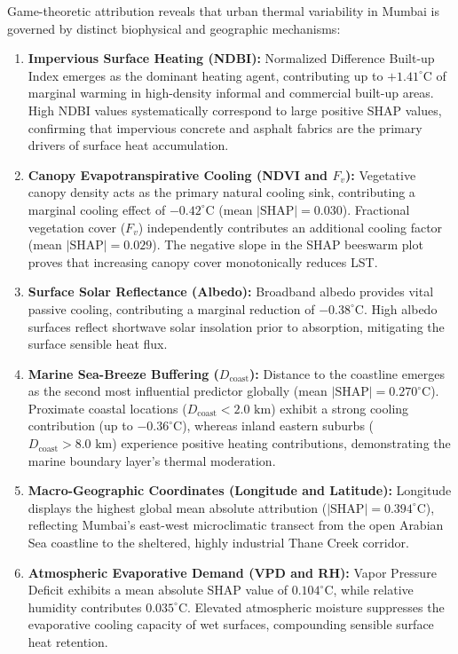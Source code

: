 \documentclass[a4paper,fleqn]{cas-sc}
\begin{document}
Game-theoretic attribution reveals that urban thermal variability in Mumbai is governed by distinct biophysical and geographic mechanisms:
\begin{enumerate}[1.]
    \item \textbf{Impervious Surface Heating (NDBI):} Normalized Difference Built-up Index emerges as the dominant heating agent, contributing up to $+1.41^\circ\text{C}$ of marginal warming in high-density informal and commercial built-up areas. High NDBI values systematically correspond to large positive SHAP values, confirming that impervious concrete and asphalt fabrics are the primary drivers of surface heat accumulation.
    \item \textbf{Canopy Evapotranspirative Cooling (NDVI and $F_v$):} Vegetative canopy density acts as the primary natural cooling sink, contributing a marginal cooling effect of $-0.42^\circ\text{C}$ (mean $|\text{SHAP}| = 0.030$). Fractional vegetation cover ($F_v$) independently contributes an additional cooling factor (mean $|\text{SHAP}| = 0.029$). The negative slope in the SHAP beeswarm plot proves that increasing canopy cover monotonically reduces LST.
    \item \textbf{Surface Solar Reflectance (Albedo):} Broadband albedo provides vital passive cooling, contributing a marginal reduction of $-0.38^\circ\text{C}$. High albedo surfaces reflect shortwave solar insolation prior to absorption, mitigating the surface sensible heat flux.
    \item \textbf{Marine Sea-Breeze Buffering ($D_{\text{coast}}$):} Distance to the coastline emerges as the second most influential predictor globally (mean $|\text{SHAP}| = 0.270^\circ\text{C}$). Proximate coastal locations ($D_{\text{coast}} < 2.0\text{ km}$) exhibit a strong cooling contribution (up to $-0.36^\circ\text{C}$), whereas inland eastern suburbs ($D_{\text{coast}} > 8.0\text{ km}$) experience positive heating contributions, demonstrating the marine boundary layer's thermal moderation.
    \item \textbf{Macro-Geographic Coordinates (Longitude and Latitude):} Longitude displays the highest global mean absolute attribution ($|\text{SHAP}| = 0.394^\circ\text{C}$), reflecting Mumbai's east-west microclimatic transect from the open Arabian Sea coastline to the sheltered, highly industrial Thane Creek corridor.
    \item \textbf{Atmospheric Evaporative Demand (VPD and RH):} Vapor Pressure Deficit exhibits a mean absolute SHAP value of $0.104^\circ\text{C}$, while relative humidity contributes $0.035^\circ\text{C}$. Elevated atmospheric moisture suppresses the evaporative cooling capacity of wet surfaces, compounding sensible surface heat retention.
\end{enumerate}
\end{document}
